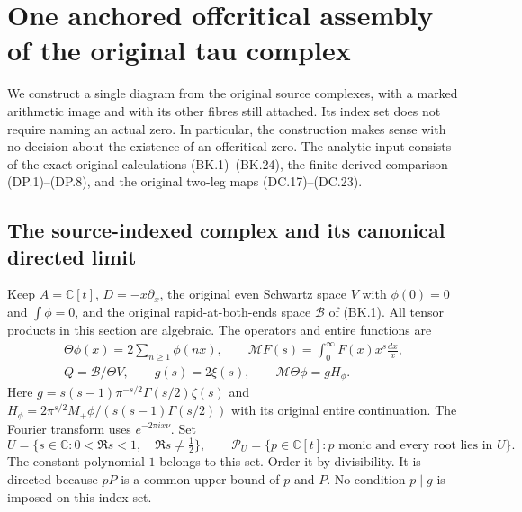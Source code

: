\section{One anchored offcritical assembly of the original tau complex}
\label{CFStage:sec:coherent-offcritical-assembly}

We construct a single diagram from the original source complexes, with a
marked arithmetic image and with its other fibres still attached.  Its
index set does not require naming an actual zero.  In particular, the
construction makes sense with no decision about the existence of an
offcritical zero.  The analytic input consists of the exact original
calculations (BK.1)--(BK.24), the finite derived comparison (DP.1)--(DP.8),
and the original two-leg maps (DC.17)--(DC.23).

\subsection{The source-indexed complex and its canonical directed limit}

Keep $A=\mathbb C[t]$, $D=-x\partial_x$, the original even Schwartz
space $V$ with $\phi(0)=0$ and $\int\phi=0$, and the original
rapid-at-both-ends space $\mathscr B$ of (BK.1).  All tensor products
in this section are algebraic.  The operators and entire functions are
\[
 \begin{gathered}
 \Theta\phi(x)=2\sum_{n\ge1}\phi(nx),\qquad
 \mathcal MF(s)=\int_0^\infty F(x)x^s\frac{dx}{x},\\
 Q=\mathscr B/\Theta V,
 \qquad g(s)=2\xi(s),\qquad \mathcal M\Theta\phi=gH_\phi.
 \end{gathered}
                                                               \tag{CAU.1}
\]
Here $g=s(s-1)\pi^{-s/2}\Gamma(s/2)\zeta(s)$ and
$H_\phi=2\pi^{s/2}M_+\phi/(s(s-1)\Gamma(s/2))$ with its original
entire continuation.  The Fourier transform uses $e^{-2\pi ix\nu}$.
Set
\[
 U=\{s\in\mathbb C:0<\Re s<1,\quad\Re s\ne\tfrac12\},
 \qquad
 \mathcal P_U=\{p\in\mathbb C[t]:p\text{ monic and every root lies in }U\}.
                                                               \tag{CAU.2}
\]
The constant polynomial $1$ belongs to this set.  Order it by divisibility.
It is directed because $pP$ is a common upper bound of $p$ and $P$.
No condition $p\mid g$ is imposed on this index set.

